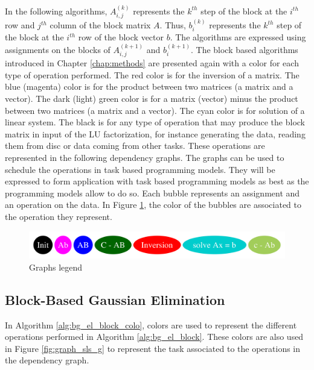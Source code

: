 In the following algorithms, $A_{i,j}^{(k)}$ represents the $k^{th}$ step of the block at the $i^{th}$ row and $j^{th}$ column of the block matrix $A$.
Thus, $b_i^{(k)}$ represents the $k^{th}$ step of the block at the $i^{th}$ row of the block vector $b$.
The algorithms are expressed using assignments on the blocks of $A_{i,j}^{(k+1)}$ and $b_i^{(k+1)}$.
The block based algorithms introduced in Chapter \ref{chap:methods} are presented again with a color for each type of operation performed.
The red color is for the inversion of a matrix.
The blue (magenta) color is for the product between two matrices (a matrix and a vector).
The dark (light) green color is for a matrix (vector) minus the product between two matrices (a matrix and a vector).
The cyan color is for solution of a linear system.
The black is for any type of operation that may produce the block matrix in input of the LU factorization, for instance generating the data, reading them from disc or data coming from other tasks.
These operations are represented in the following dependency graphs.
The graphs can be used to schedule the operations in task based programming models.
They will be expressed to form application with task based programming models as best as the programming models allow to do so.
Each bubble represents an assignment and an operation on the data.
In Figure \ref{fig:graph_legends}, the color of the bubbles are associated to the operation they represent.

\begin{figure}[h]
	\centering
	\includegraphics[width=\textwidth]{legend}
	\caption{Graphs legend\label{fig:graph_legends}}
\end{figure}

\subsection{Block-Based Gaussian Elimination}


In Algorithm \ref{alg:bg_el_block_colo}, colors are used to represent the different operations performed in Algorithm \ref{alg:bg_el_block}.
These colors are also used in Figure \ref{fig:graph_sls_g} to represent the task associated to the operations in the dependency graph.

